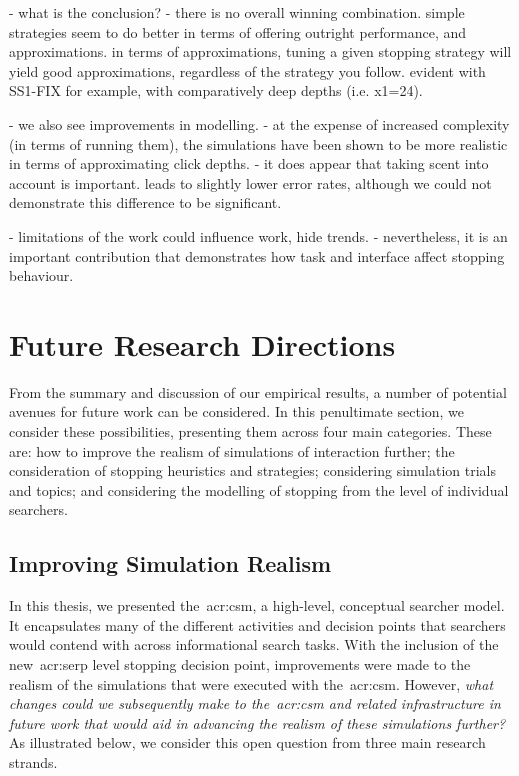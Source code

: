 - what is the conclusion?
    - there is no overall winning combination. simple strategies seem to do better in terms of offering outright performance, and approximations. in terms of approximations, tuning a given stopping strategy will yield good approximations, regardless of the strategy you follow. evident with SS1-FIX for example, with comparatively deep depths (i.e. x1=24).

- we also see improvements in modelling.
- at the expense of increased complexity (in terms of running them), the simulations have been shown to be more realistic in terms of approximating click depths.
    - it does appear that taking scent into account is important. leads to slightly lower error rates, although we could not demonstrate this difference to be significant.

- limitations of the work could influence work, hide trends.
- nevertheless, it is an important contribution that demonstrates how task and interface affect stopping behaviour.

\section{Future Research Directions}\label{sec:conclusions:future}
From the summary and discussion of our empirical results, a number of potential avenues for future work can be considered. In this penultimate section, we consider these possibilities, presenting them across four main categories. These are: how to improve the realism of simulations of interaction further; the consideration of stopping heuristics and strategies; considering simulation trials and topics; and considering the modelling of stopping from the level of individual searchers.

\subsection{Improving Simulation Realism}\label{sec:conclusions:future:improving}
In this thesis, we presented the~\gls{acr:csm}, a high-level, conceptual searcher model. It encapsulates many of the different activities and decision points that searchers would contend with across informational search tasks. With the inclusion of the new~\gls{acr:serp} level stopping decision point, improvements were made to the realism of the simulations that were executed with the~\gls{acr:csm}. However, \emph{what changes could we subsequently make to the~\gls{acr:csm} and related infrastructure in future work that would aid in advancing the realism of these simulations further?} As illustrated below, we consider this open question from three main research strands.

